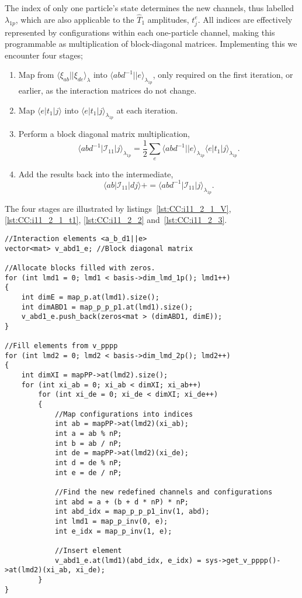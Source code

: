 The index of only one particle's state determines the new channels, thus labelled $\lambda_{1p}$, which are also applicable to the $\hat{T}_1$ amplitudes, $t_j^e$.
All indices are effectively represented by configurations within each one-particle channel, making this programmable as multiplication of block-diagonal matrices.
Implementing this we encounter four stages;
\begin{enumerate}
\item Map from $\langle \xi_{ab}||\xi_{de} \rangle_{\lambda}$ into $\langle abd^{-1} || e \rangle_{\lambda_{1p}}$, only required on the first iteration, or earlier, as the interaction matrices do not change.
\item Map $\langle e | t_1 | j \rangle$ into $\langle e |t_1|j\rangle_{\lambda_{1p}}$ at each iteration.
\item Perform a block diagonal matrix multiplication,
\begin{equation}
\langle abd^{-1} | \mathcal{I}_{11} | j \rangle_{\lambda_{1p}} = \frac{1}{2} \sum_e
\langle abd^{-1} || e \rangle_{\lambda_{1p}} \langle e |t_1|j\rangle_{\lambda_{1p}} .
\end{equation}
\item Add the results back into the intermediate,
\begin{equation}
\langle ab | \mathcal{I}_{11} | dj \rangle
+=
\langle abd^{-1} | \mathcal{I}_{11} | j \rangle_{\lambda_{1p}} .
\end{equation}
\end{enumerate}
The four stages are illustrated by listings~\ref{lst:CC:i11_2_1_V}, \ref{lst:CC:i11_2_1_t1}, \ref{lst:CC:i11_2_2} and~\ref{lst:CC:i11_2_3}.
\begin{lstlisting}[float,label={lst:CC:i11_2_1_V},caption={Mapping from $\langle \xi_{ab}||\xi_{de} \rangle_{\lambda} $ into $\langle abd^{-1} || e \rangle_{\lambda_{1p}}$, only needed once because the matrix elements stay constant during simulations.}]
//Interaction elements <a_b_d1||e>
vector<mat> v_abd1_e; //Block diagonal matrix

//Allocate blocks filled with zeros.
for (int lmd1 = 0; lmd1 < basis->dim_lmd_1p(); lmd1++)
{ 
	int dimE = map_p.at(lmd1).size();
    int dimABD1 = map_p_p_p1.at(lmd1).size();
	v_abd1_e.push_back(zeros<mat > (dimABD1, dimE));
}

//Fill elements from v_pppp
for (int lmd2 = 0; lmd2 < basis->dim_lmd_2p(); lmd2++)
{ 
	int dimXI = mapPP->at(lmd2).size();
    for (int xi_ab = 0; xi_ab < dimXI; xi_ab++)
    	for (int xi_de = 0; xi_de < dimXI; xi_de++)
        { 
        	//Map configurations into indices
        	int ab = mapPP->at(lmd2)(xi_ab);
            int a = ab % nP;
            int b = ab / nP;
            int de = mapPP->at(lmd2)(xi_de);
            int d = de % nP;
            int e = de / nP;

			//Find the new redefined channels and configurations
            int abd = a + (b + d * nP) * nP; 
            int abd_idx = map_p_p_p1_inv(1, abd); 
            int lmd1 = map_p_inv(0, e);
            int e_idx = map_p_inv(1, e);

			//Insert element            
			v_abd1_e.at(lmd1)(abd_idx, e_idx) = sys->get_v_pppp()->at(lmd2)(xi_ab, xi_de);
		}
}
\end{lstlisting}
